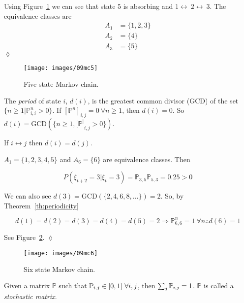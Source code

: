 \begin{example}
Using Figure~\ref{fig:09mc5} we can see that state $5$ is absorbing and $1\leftrightarrow~2\leftrightarrow~3$.
The equivalence classes are
\begin{align*}
A_1 &= \{1,2,3\} \\
A_2 &= \{4\} \\
A_3 &= \{5\}
\end{align*}
$\lozenge$
\end{example}

\begin{figure}[ht!]
\centering
\texttt{[image: images/09mc5]}
\caption{Five state Markov chain.}%
\label{fig:09mc5}
\end{figure}

\begin{definition}
The \textit{period} of state $i$, $d(i)$, is the greatest common divisor (GCD) of the set $\{n\geq1|\mathbb{P}_{i,i}^n>0\}$.
If ${[\mathbb{P}^n]}_{i,j} = 0~\forall n\geq1$, then $d(i)=0$.
So $d(i) = \text{GCD}(\{n\geq1,{[\mathbb{P}^]}_{i,j}>0\})$.
\end{definition}

\begin{theorem}%
\label{th:periodicity}
If $i\leftrightarrow j$ then $d(i)=d(j)$.
\end{theorem}

\begin{example}
$A_1=\{1,2,3,4,5\}$ and $A_6=\{6\}$ are equivalence classes.
Then

\begin{equation*}
P(\xi_{t+2}=3|\xi_t=3) = \mathbb{P}_{3,5}\mathbb{P}_{5,3} = 0.25> 0
\end{equation*}

We can also see $d(3)=\text{GCD}(\{2,4,6,8,\ldots\})=2$.
So, by Theorem~\ref{th:periodicity}

\begin{equation*}
d(1)=d(2)=d(3)=d(4)=d(5)=2 \Rightarrow \mathbb{P}_{6,6}^n=1~\forall n \therefore d(6)=1
\end{equation*}

See Figure~\ref{fig:09mc6}.
$\lozenge$
\end{example}

\begin{figure}[ht!]
\centering
\texttt{[image: images/09mc6]}
\caption{Six state Markov chain.}%
\label{fig:09mc6}
\end{figure}

\begin{definition}
Given a matrix $\mathbb{P}$ such that $\mathbb{P}_{i,j}\in[0,1]~\forall i,j$, then $\sum_j\mathbb{P}_{i,j}=1$.
$\mathbb{P}$ is called a \textit{stochastic matrix}.
\end{definition}

